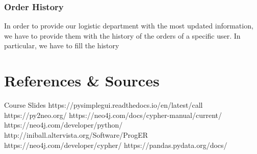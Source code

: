 \documentclass[a4paper,12pt]{article}
\begin{document}
\subsubsection{Order History}
In order to provide our logistic department with the most updated information, we have to provide them with the history of the orders of a specific user.
In particular, we have to fill the history

\newpage
\section{References \& Sources}
  \begin{thebibliography}{9}
    \bibitem{} Course Slides
    \bibitem{} https://pysimplegui.readthedocs.io/en/latest/call%
    \bibitem{} https://py2neo.org/
    \bibitem{} https://neo4j.com/docs/cypher-manual/current/
    \bibitem{} https://neo4j.com/developer/python/
    \bibitem{} http://iniball.altervista.org/Software/ProgER
    \bibitem{} https://neo4j.com/developer/cypher/
    \bibitem{} https://pandas.pydata.org/docs/
  \end{thebibliography}
\end{document}
